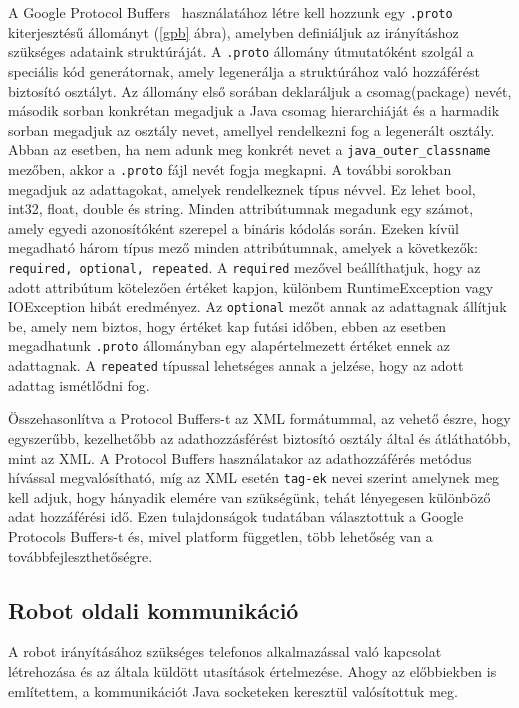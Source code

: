 A Google Protocol Buffers~\cite{protobuff} használatához létre kell hozzunk egy \texttt{.proto} kiterjesztésű állományt (\ref{gpb} ábra), amelyben definiáljuk az irányításhoz szükséges adataink struktúráját.
A \texttt{.proto} állomány útmutatóként szolgál a speciális kód generátornak, amely legenerálja a struktúrához való hozzáférést biztosító osztályt.
Az állomány első sorában deklaráljuk a csomag(package) nevét, második sorban konkrétan megadjuk a Java csomag hierarchiáját és a harmadik sorban megadjuk az osztály nevet, amellyel rendelkezni fog a legenerált osztály. Abban az esetben, ha nem adunk meg konkrét nevet a \texttt{java\_outer\_classname} mezőben, akkor a \texttt{.proto} fájl nevét fogja megkapni. A további sorokban megadjuk az adattagokat, amelyek rendelkeznek típus névvel. Ez lehet bool, int32, float, double és string. Minden attribútumnak megadunk egy számot, amely egyedi azonosítóként szerepel a bináris kódolás során. Ezeken kívül megadható három típus mező minden attribútumnak, amelyek a következők: \texttt{required, optional, repeated}. A \texttt{required} mezővel beállíthatjuk, hogy az adott attribútum kötelezően értéket kapjon, különbem RuntimeException vagy IOException hibát eredményez.  Az \texttt{optional} mezőt annak az adattagnak állítjuk be, amely nem biztos, hogy értéket kap futási időben, ebben az esetben megadhatunk \texttt{.proto} állományban egy alapértelmezett értéket ennek az adattagnak. A \texttt{repeated} típussal lehetséges annak a jelzése, hogy az adott adattag ismétlődni fog.



Összehasonlítva a Protocol Buffers-t az XML formátummal, az vehető észre, hogy egyszerűbb, kezelhetőbb az adathozzásférést biztosító osztály által és átláthatóbb, mint az XML. A Protocol Buffers használatakor az adathozzáférés metódus hívással megvalósítható, míg az XML esetén \texttt{tag-ek} nevei szerint amelynek meg kell adjuk, hogy hányadik elemére van szükségünk, tehát lényegesen különböző adat hozzáférési idő. Ezen tulajdonságok tudatában választottuk a Google Protocols Buffers-t és, mivel platform független, több lehetőség van a továbbfejleszthetőségre.

\subsection{Robot oldali kommunikáció}

A robot irányításához szükséges telefonos alkalmazással való kapcsolat létrehozása és az általa küldött utasítások értelmezése. Ahogy az előbbiekben is említettem, a kommunikációt Java socketeken keresztül valósítottuk meg.

